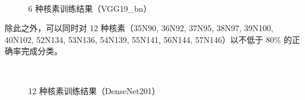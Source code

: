 \documentclass[AutoFakeBold]{LZUThesis}
\begin{document}
\begin{figure}[H]
	\centering
	\\	
    \caption{6 种核素训练结果（VGG19\_bn）}
    \label{fig_learn6_vgg19-bn}
\end{figure}


除此之外，可以同时对 12 种核素（35N90, 36N92, 37N95, 38N97, 39N100, 40N102, 52N134, 53N136, 54N139, 55N141, 56N144, 57N146）以不低于 80\% 的正确率完成分类。

\begin{figure}[H]
	\centering
	\\	
    \caption{12 种核素训练结果（DenseNet201）}
    \label{fig_learn12-densenet201}
\end{figure}
\end{document}
